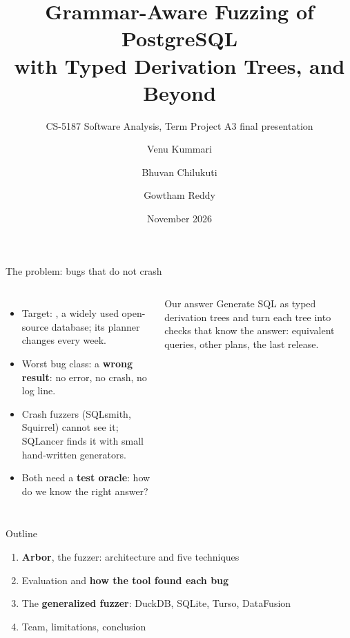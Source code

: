 \documentclass[aspectratio=169,10pt]{beamer}
\title{Grammar-Aware Fuzzing of PostgreSQL\\with Typed Derivation Trees, and Beyond}
\subtitle{CS-5187 Software Analysis, Term Project A3 \quad final presentation}
\author{Venu Kummari \and Bhuvan Chilukuti \and Gowtham Reddy}
\institute{IIT Guwahati}
\date{November 2026}
\begin{document}
\maketitle
{}

\begin{frame}{The problem: bugs that do not crash}
\begin{columns}[T]
\begin{itemize}
  \item Target: \textbf{\pg}, a widely used open-source database; its planner changes every week.
  \item Worst bug class: a \textbf{wrong result}: no error, no crash, no log line.
  \item Crash fuzzers (SQLsmith, Squirrel) cannot see it; SQLancer finds it with small hand-written generators.
  \item Both need a \textbf{test oracle}: how do we know the right answer?
\end{itemize}
\begin{block}{Our answer}
Generate SQL as \alert{typed derivation trees} and turn each tree into
\alert{checks that know the answer}: equivalent queries, other plans, the last release.
\end{block}
\end{columns}
\end{frame}

\begin{frame}{Outline}
\begin{enumerate}
  \item \textbf{Arbor}, the \pg fuzzer: architecture and five techniques
  \item Evaluation and \textbf{how the tool found each bug}
  \item The \textbf{generalized fuzzer}: DuckDB, SQLite, Turso, DataFusion
  \item Team, limitations, conclusion
\end{enumerate}
\end{frame}
\end{document}
